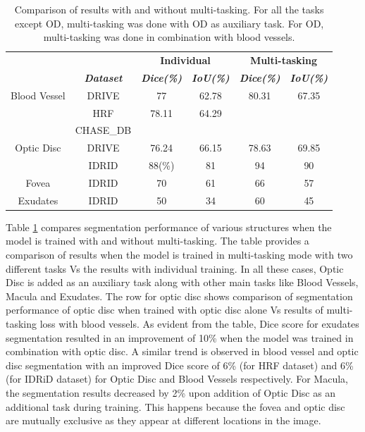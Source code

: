 \documentclass{article}
\begin{document}
\begin{table}[htbp]
\caption{Comparison of results with and without multi-tasking. For all the tasks except OD, multi-tasking was done with OD as auxiliary task. For OD, multi-tasking was done in combination with blood vessels.}
\begin{center}
\begin{tabular}{|c|c|c|c|c|c|}
\hline
&&\multicolumn{2}{|c|}{\textbf{Individual}}& \multicolumn{2}{|c|}{\textbf{Multi-tasking}} \\
\cline{3-6}
&\textbf{\textit{Dataset}}& \textbf{\textit{Dice(\%)}}& \textbf{\textit{IoU(\%)}}& \textbf{\textit{Dice(\%)}}& \textbf{\textit{IoU(\%)}}  \\
\hline
Blood Vessel & DRIVE & 77 & 62.78 & 80.31 & 67.35  \\
\cline{2-6}
& HRF & 78.11 & 64.29 &  & \\
\cline{2-6}
& CHASE\_DB &  &  &  & \\
\hline
Optic Disc & DRIVE & 76.24 & 66.15 & 78.63 & 69.85  \\
\cline{2-6}
&IDRID & 88(\%) & 81 & 94 & 90 \\
\hline
Fovea& IDRID & 70 & 61 &66 &57  \\
\hline
Exudates & IDRID & 50 & 34 & 60 & 45  \\
\hline
\end{tabular}
\label{tab:results}
\end{center}
\end{table}

Table \ref{tab:results} compares segmentation performance of various structures when the model is trained with and without multi-tasking. The table provides a comparison of  results when  the model is trained in multi-tasking mode with two different tasks  Vs the results with individual training. In all these cases, Optic Disc is added as an auxiliary task along with other main tasks like Blood Vessels, Macula and Exudates. The row for optic disc shows comparison of segmentation performance of optic disc when trained with optic disc alone Vs results of multi-tasking loss with blood vessels.  As evident from the table, Dice score for exudates segmentation resulted in an improvement  of 10\% when the model was trained in combination with optic disc. A similar trend is observed in blood vessel and optic disc segmentation with an improved Dice score of 6\% (for HRF dataset) and 6\% (for IDRiD dataset)  for Optic Disc and Blood Vessels respectively. For Macula, the segmentation results decreased by 2\% upon addition of Optic Disc as an additional task during training. This happens because the fovea and optic disc are mutually exclusive as they appear at different locations in the image.
\end{document}
